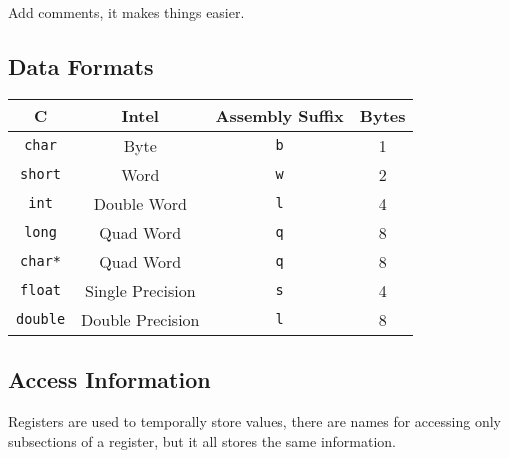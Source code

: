 \documentclass[10pt]{armath}
\newcommand{\s}[1]{\texttt{#1}}
\begin{document}
Add comments, it makes things easier.

\subsection{Data Formats}%
\label{sub:data_formats}

\begin{center}
  \begin{tabular}{c c c c}
    C & Intel & Assembly Suffix & Bytes\\
    \hline
    \s{char} & Byte & \s{b} & 1\\
    \s{short} & Word & \s{w} & 2\\
    \s{int} & Double Word & \s{l} & 4\\
    \s{long} & Quad Word & \s{q} & 8\\
    \s{char*} & Quad Word & \s{q} & 8\\
    \s{float} & Single Precision & \s{s} & 4\\
    \s{double} & Double Precision & \s{l} & 8\\
    \hline
  \end{tabular}
\end{center}

\subsection{Access Information}%
\label{sub:access_information}

Registers are used to temporally store values, there are names for accessing
only subsections of a register, but it all stores the same information.
\end{document}
